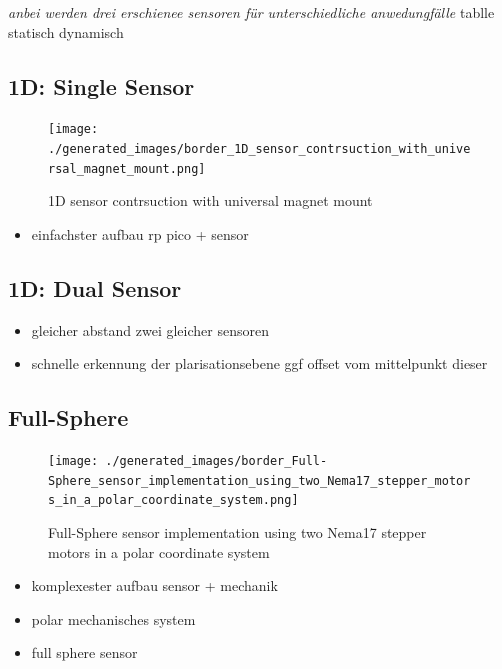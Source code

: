 \emph{anbei werden drei erschienee sensoren für unterschiedliche
anwedungfälle } tablle statisch dynamisch

\hypertarget{d-single-sensor}{%
\subsection{1D: Single Sensor}\label{d-single-sensor}}

\begin{figure}
\centering
\texttt{[image: ./generated\_images/border\_1D\_sensor\_contrsuction\_with\_universal\_magnet\_mount.png]}
\caption{1D sensor contrsuction with universal magnet mount
\label{1D_sensor_contrsuction_with_universal_magnet_mount.png}}
\end{figure}

\begin{itemize}
\tightlist
\item
  einfachster aufbau rp pico + sensor
\end{itemize}

\hypertarget{d-dual-sensor}{%
\subsection{1D: Dual Sensor}\label{d-dual-sensor}}

\begin{itemize}
\tightlist
\item
  gleicher abstand zwei gleicher sensoren
\item
  schnelle erkennung der plarisationsebene ggf offset vom mittelpunkt
  dieser
\end{itemize}

\hypertarget{full-sphere}{%
\subsection{Full-Sphere}\label{full-sphere}}

\begin{figure}
\centering
\texttt{[image: ./generated\_images/border\_Full-Sphere\_sensor\_implementation\_using\_two\_Nema17\_stepper\_motors\_in\_a\_polar\_coordinate\_system.png]}
\caption{Full-Sphere sensor implementation using two Nema17 stepper
motors in a polar coordinate system
\label{Full-Sphere_sensor_implementation_using_two_Nema17_stepper_motors_in_a_polar_coordinate_system.png}}
\end{figure}

\begin{itemize}
\tightlist
\item
  komplexester aufbau sensor + mechanik
\item
  polar mechanisches system
\item
  full sphere sensor
\end{itemize}

